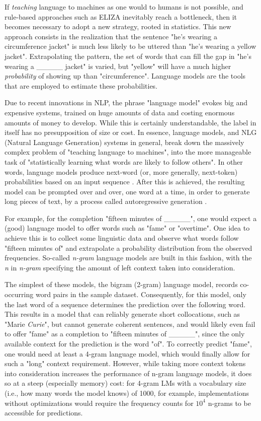 If \emph{teaching} language to machines as one would to humans is not possible, and rule-based approaches such as ELIZA inevitably reach a bottleneck, then it becomes necessary to adopt a new strategy, rooted in statistics.
This new approach consists in the realization that the sentence "he's wearing a circumference jacket" is much less likely to be uttered than "he's wearing a yellow jacket".
Extrapolating the pattern, the set of words that can fill the gap in "he's wearing a \_\_\_\_\_ jacket" is varied, but "yellow" will have a much higher \emph{probability} of showing up than "circumference".
Language models are the tools that are employed to estimate these probabilities.

Due to recent innovations in NLP, the phrase "language model" evokes big and expensive systems, trained on huge amounts of data and costing enormous amounts of money to develop.
While this is certainly understandable, the label in itself has no presupposition of size or cost.
In essence, language models, and NLG (Natural Language Generation) systems in general, break down the massively complex problem of "teaching language to machines", into the more manageable task of "statistically learning what words are likely to follow others".
In other words, language models produce next-word (or, more generally, next-token) probabilities based on an input sequence \citep{gao2004introduction}.
After this is achieved, the resulting model can be prompted over and over, one word at a time, in order to generate long pieces of text, by a process called autoregressive generation \citep{lin2021limitationsautoregressivemodelsalternatives}.

For example, for the completion "fifteen minutes of \_\_\_\_\_", one would expect a (good) language model to offer words such as "fame" or "overtime".
One idea to achieve this is to collect some linguistic data and observe what words follow "fifteen minutes of" and extrapolate a probability distribution from the observed frequencies.
So-called \emph{n-gram} language models \citep{chen1999empirical} are built in this fashion, with the \emph{n} in \emph{n-gram} specifying the amount of left context taken into consideration.

The simplest of these models, the bigram (2-gram) language model, records co-occurring word pairs in the sample dataset.
Consequently, for this model, only the last word of a sequence determines the prediction over the following word.
This results in a model that can reliably generate short collocations, such as "Marie \emph{Curie}", but cannot generate coherent sentences, and would likely even fail to offer "fame" as a completion to "fifteen minutes of \_\_\_\_\_", since the only available context for the prediction is the word "of".
To correctly predict "fame", one would need at least a 4-gram language model, which would finally allow for such a "long" context requirement.
However, while taking more context tokens into consideration increases the performance of n-gram language models, it does so at a steep (especially memory) cost: for 4-gram LMs with a vocabulary size (i.e., how many words the model knows) of 1000, for example, implementations without optimizations would require the frequency counts for $10^{4}$ n-grams to be accessible for predictions.

